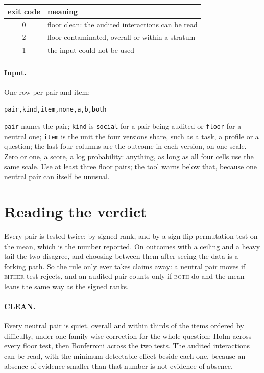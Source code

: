 \documentclass[11pt]{article}
\begin{document}
\begin{center}
\begin{tabular}{cl}
\toprule
exit code & meaning \\
\midrule
0 & floor clean: the audited interactions can be read \\
2 & floor contaminated, overall or within a stratum \\
1 & the input could not be used \\
\bottomrule
\end{tabular}
\end{center}

\paragraph{Input.} One row per pair and item:

\begin{Verbatim}[fontsize=\small]
pair,kind,item,none,a,b,both
\end{Verbatim}

\noindent
\texttt{pair} names the pair; \texttt{kind} is \texttt{social} for a pair being
audited or \texttt{floor} for a neutral one; \texttt{item} is the unit the four
versions share, such as a task, a profile or a question; the last four columns
are the outcome in each version, on one scale. Zero or one, a score, a log
probability: anything, as long as all four cells use the same scale. Use at
least three floor pairs; the tool warns below that, because one neutral pair can
itself be unusual.

\section*{Reading the verdict}

Every pair is tested twice: by signed rank, and by a sign-flip permutation test
on the mean, which is the number reported. On outcomes with a ceiling and a
heavy tail the two disagree, and choosing between them after seeing the data is
a forking path. So the rule only ever takes claims away: a neutral pair moves if
\textsc{either} test rejects, and an audited pair counts only if \textsc{both}
do and the mean leans the same way as the signed ranks.

\paragraph{CLEAN.} Every neutral pair is quiet, overall and within thirds of the
items ordered by difficulty, under one family-wise correction for the whole
question: Holm across every floor test, then Bonferroni across the two tests.
The audited interactions can be read, with the minimum detectable effect beside
each one, because an absence of evidence smaller than that number is not
evidence of absence.
\end{document}
